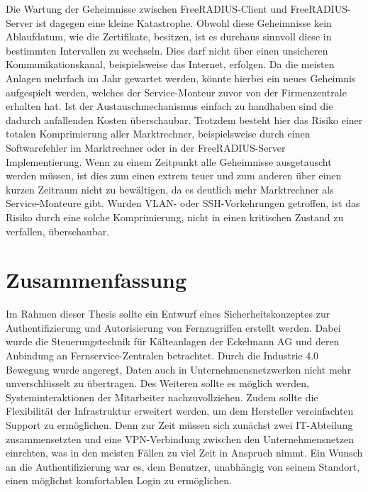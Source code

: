 \documentclass[11pt,a4paper]{report}
\begin{document}
Die Wartung der Geheimnisse zwischen FreeRADIUS-Client und FreeRADIUS-Server ist dagegen eine kleine Katastrophe. Obwohl diese Geheimnisse kein Ablaufdatum, wie die Zertifikate, besitzen, ist es durchaus sinnvoll diese in bestimmten Intervallen zu wechseln. Dies darf nicht über einen unsicheren Kommunikationskanal, beispielsweise das Internet, erfolgen. Da die meisten Anlagen mehrfach im Jahr gewartet werden, könnte hierbei ein neues Geheimnis aufgespielt werden, welches der Service-Monteur zuvor von der Firmenzentrale erhalten hat. Ist der Austauschmechanismus einfach zu handhaben sind die dadurch anfallenden Kosten überschaubar. Trotzdem besteht hier das Risiko einer totalen Komprimierung aller Marktrechner, beispielsweise durch einen Softwarefehler im Marktrechner oder in der FreeRADIUS-Server Implementierung. Wenn zu einem Zeitpunkt alle Geheimnisse ausgetauscht werden müssen, ist dies zum einen extrem teuer und zum anderen über einen kurzen Zeitraum nicht zu bewältigen, da es deutlich mehr Marktrechner als Service-Monteure gibt. Wurden VLAN- oder SSH-Vorkehrungen getroffen, ist das Risiko durch eine solche Komprimierung, nicht in einen kritischen Zustand zu verfallen, überschaubar.

\chapter{Zusammenfassung}

Im Rahmen dieser Thesis sollte ein Entwurf eines Sicherheitskonzeptes zur Authentifizierung und Autorisierung von Fernzugriffen erstellt werden. Dabei wurde die Steuerungstechnik für Kälteanlagen der Eckelmann AG und deren Anbindung an Fernservice-Zentralen betrachtet. Durch die Industrie 4.0 Bewegung wurde angeregt, Daten auch in Unternehmensnetzwerken nicht mehr unverschlüsselt zu übertragen. Des Weiteren sollte es möglich werden, Systeminteraktionen der Mitarbeiter nachzuvollziehen. Zudem sollte die Flexibilität der Infrastruktur erweitert werden, um dem Hersteller vereinfachten Support zu ermöglichen. Denn zur Zeit müssen sich zunächst zwei IT-Abteilung zusammensetzten und eine VPN-Verbindung zwischen den Unternehmensnetzen einrchten, was in den meisten Fällen zu viel Zeit in Anspruch nimmt. Ein Wunsch an die Authentifizierung war es, dem Benutzer, unabhängig von seinem Standort, einen möglichst komfortablen Login zu ermöglichen.
\end{document}
